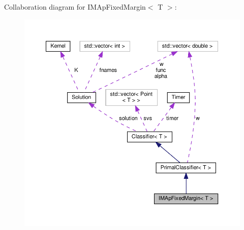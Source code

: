 Collaboration diagram for I\+M\+Ap\+Fixed\+Margin$<$ T $>$\+:
\nopagebreak
\begin{figure}[H]
\begin{center}
\leavevmode
\includegraphics[width=350pt]{class_i_m_ap_fixed_margin__coll__graph}
\end{center}
\end{figure}
